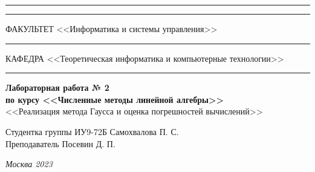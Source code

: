 \documentclass[a4paper, 14pt]{extarticle}
\begin{document}
\begin{titlepage}
\vspace{-25pt}
\hspace{-35pt}\rule{\textwidth}{2.3pt}

\vspace*{-20.3pt}
\hspace{-35pt}\rule{\textwidth}{0.4pt}

\vspace{1.5ex}
\hspace{-35pt} \noindent \small ФАКУЛЬТЕТ\hspace{80pt} <<Информатика и системы управления>>

\vspace*{-16pt}
\hspace{47pt}\rule{0.83\textwidth}{0.4pt}

\vspace{0.5ex}
\hspace{-35pt} \noindent \small КАФЕДРА\hspace{50pt} <<Теоретическая информатика и компьютерные технологии>>

\vspace*{-16pt}
\hspace{30pt}\rule{0.866\textwidth}{0.4pt}
  
\vspace{11em}

\begin{center}
\Large {\bf Лабораторная работа № 2} \\
\large {\bf по курсу <<Численные методы линейной алгебры>>} \\
\large <<Реализация метода Гаусса и оценка погрешностей вычислений>>
\end{center}\normalsize

\vspace{8em}


\begin{flushright}
  {Студентка группы ИУ9-72Б Самохвалова П. С. \hspace*{15pt}\\
  \vspace{2ex}
  Преподаватель Посевин Д. П.\hspace*{15pt}}
\end{flushright}

\bigskip

\vfill
 

\begin{center}
\textsl{Москва 2023}
\end{center}
\end{titlepage}
\end{document}

